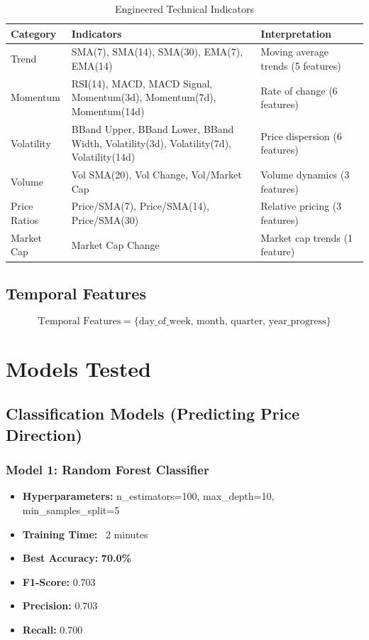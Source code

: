 \begin{table}[H]
\centering
\caption{Engineered Technical Indicators}
\small
\begin{tabularx}{\textwidth}{lXX}
\toprule
\textbf{Category} & \textbf{Indicators} & \textbf{Interpretation} \\
\midrule
Trend & SMA(7), SMA(14), SMA(30), EMA(7), EMA(14) & Moving average trends (5 features) \\
Momentum & RSI(14), MACD, MACD Signal, Momentum(3d), Momentum(7d), Momentum(14d) & Rate of change (6 features) \\
Volatility & BBand Upper, BBand Lower, BBand Width, Volatility(3d), Volatility(7d), Volatility(14d) & Price dispersion (6 features) \\
Volume & Vol SMA(20), Vol Change, Vol/Market Cap & Volume dynamics (3 features) \\
Price Ratios & Price/SMA(7), Price/SMA(14), Price/SMA(30) & Relative pricing (3 features) \\
Market Cap & Market Cap Change & Market cap trends (1 feature) \\
\bottomrule
\end{tabularx}
\end{table}

\subsection{Temporal Features}

\begin{equation}
\text{Temporal Features} = \{\text{day\_of\_week, month, quarter, year\_progress}\}
\end{equation}

\section{Models Tested}

\subsection{Classification Models (Predicting Price Direction)}

\subsubsection{Model 1: Random Forest Classifier}
\begin{itemize}
    \item \textbf{Hyperparameters:} n\_estimators=100, max\_depth=10, min\_samples\_split=5
    \item \textbf{Training Time:} ~2 minutes
    \item \textbf{Best Accuracy:} \textbf{70.0\%}
    \item \textbf{F1-Score:} 0.703
    \item \textbf{Precision:} 0.703
    \item \textbf{Recall:} 0.700
\end{itemize}

